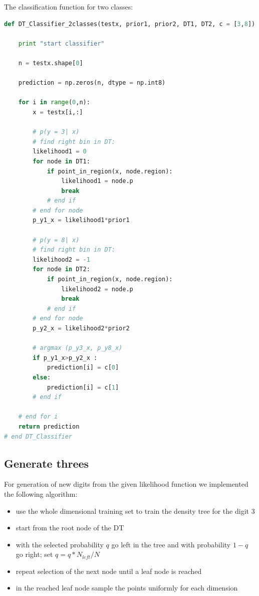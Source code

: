 \documentclass{article}
\begin{document}
\FloatBarrier

The classification function for two classes:

\begin{lstlisting}[language=Python]
def DT_Classifier_2classes(testx, prior1, prior2, DT1, DT2, c = [3,8]):
    
    print "start classifier"
    
    n = testx.shape[0]
    
    prediction = np.zeros(n, dtype = np.int8)
    
    for i in range(0,n):
        x = testx[i,:]
            
        # p(y = 3| x)
        # find right bin in DT:
        likelihood1 = 0
        for node in DT1:
            if point_in_region(x, node.region):
                likelihood1 = node.p
                break 
            # end if
        # end for node
        p_y1_x = likelihood1*prior1
           
        # p(y = 8| x) 
        # find right bin in DT:
        likelihood2 = -1
        for node in DT2:
            if point_in_region(x, node.region):
                likelihood2 = node.p
                break 
            # end if
        # end for node        
        p_y2_x = likelihood2*prior2
           
        # argmax (p_y3_x, p_y8_x) 
        if p_y1_x>p_y2_x :
            prediction[i] = c[0]
        else:
            prediction[i] = c[1]
        # end if        
           
    # end for i    
    return prediction
# end DT_Classifier
\end{lstlisting}


\subsection{Generate threes}
For generation of new digits from the given likelihood function we implemented the following algorithm:
\begin{itemize}
\item use the whole dimensional training set to train the density tree for the digit $3$
\item start from the root node of the DT
\item with the selected probability $q$ go left in the tree and with probability $1-q$ go right; set $q=q*N_{left}/N$
\item repeat selection of the next node until a leaf node is reached
\item in the reached leaf node sample the points uniformly for each dimension
\end{itemize}
\end{document}
